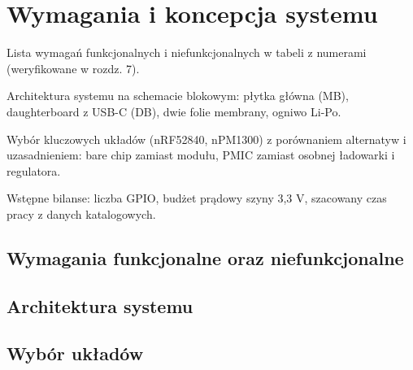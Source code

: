 \chapter{Wymagania i koncepcja systemu}\label{ch:wymagania}
\begin{zawartosc}
  \item Lista wymagań funkcjonalnych i niefunkcjonalnych w tabeli z numerami (weryfikowane w rozdz. 7).
  \item Architektura systemu na schemacie blokowym: płytka główna (MB), daughterboard z USB-C (DB), dwie folie membrany, ogniwo Li-Po.
  \item Wybór kluczowych układów (nRF52840, nPM1300) z porównaniem alternatyw i uzasadnieniem: bare chip zamiast modułu, PMIC zamiast osobnej ładowarki i regulatora.
  \item Wstępne bilanse: liczba GPIO, budżet prądowy szyny 3,3 V, szacowany czas pracy z danych katalogowych.
\end{zawartosc}

\section{Wymagania funkcjonalne oraz niefunkcjonalne}\label{sec:wymagania}

\section{Architektura systemu}\label{sec:architektura}

\section{Wybór układów}\label{sec:wybor}

